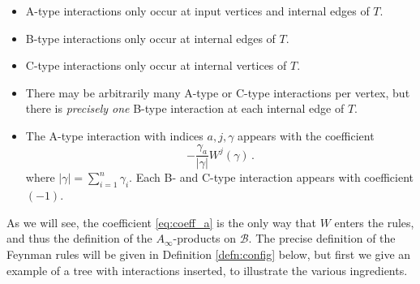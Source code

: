 \documentclass[english,letter paper,12pt,leqno]{article}
\theoremstyle{example}
\numberwithin{equation}{section}
\def\be{\begin{equation}}
\def\ee{\end{equation}}
\begin{document}
\begin{itemize}
\item A-type interactions only occur at input vertices and internal edges of $T$. 
\item B-type interactions only occur at internal edges of $T$.
\item C-type interactions only occur at internal vertices of $T$.
\item There may be arbitrarily many A-type or C-type interactions per vertex, but there is \emph{precisely one} B-type interaction at each internal edge of $T$.
\item The A-type interaction with indices $a,j, \gamma$ appears with the coefficient
\be\label{eq:coeff_a}
-\frac{\gamma_a}{|\gamma|} W^j( \gamma)\,.
\ee
where $|\gamma| = \sum_{i=1}^n \gamma_i$. Each B- and C-type interaction appears with coefficient $(-1)$.
\end{itemize}

As we will see, the coefficient \eqref{eq:coeff_a} is the only way that $W$ enters the rules, and thus the definition of the $A_\infty$-products on $\mathscr{B}$. The precise definition of the Feynman rules will be given in Definition \ref{defn:config} below, but first we give an example of a tree with interactions inserted, to illustrate the various ingredients.
\end{document}
